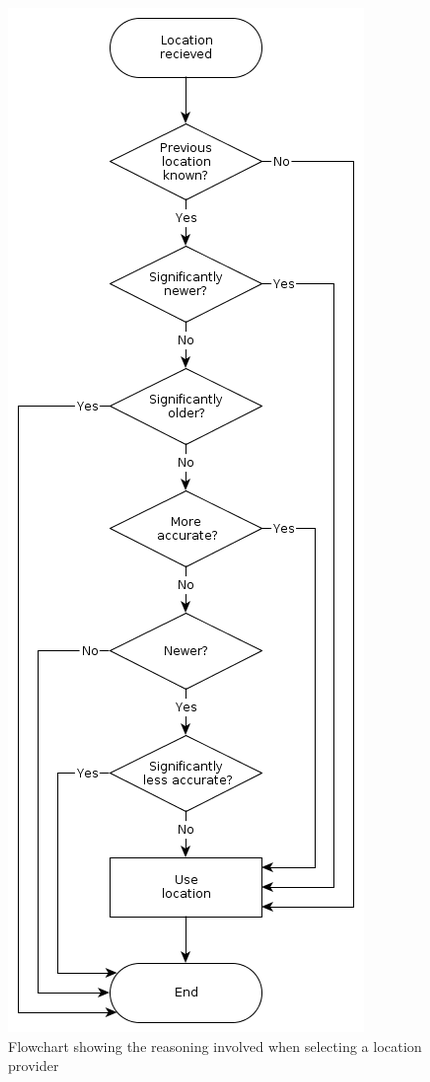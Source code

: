 \begin{figure}[H]
  \centering
   \includegraphics[height=0.83\textheight]{Images/diagrams/location.png}
  \caption{Flowchart showing the reasoning involved when selecting a location provider}
  \label{fig:location}
\end{figure}


